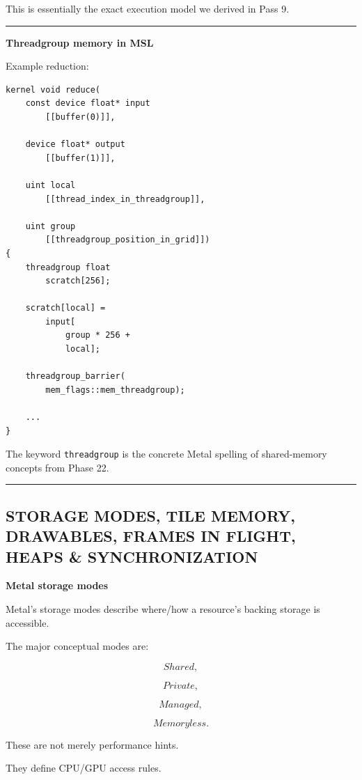 This is essentially the exact execution model we derived in Pass 9.

\begin{center}\rule{0.5\linewidth}{0.5pt}\end{center}

\textbf{Threadgroup memory in MSL}

Example reduction:

\begin{verbatim}
kernel void reduce(
    const device float* input
        [[buffer(0)]],

    device float* output
        [[buffer(1)]],

    uint local
        [[thread_index_in_threadgroup]],

    uint group
        [[threadgroup_position_in_grid]])
{
    threadgroup float
        scratch[256];

    scratch[local] =
        input[
            group * 256 +
            local];

    threadgroup_barrier(
        mem_flags::mem_threadgroup);

    ...
}
\end{verbatim}

The keyword \texttt{threadgroup} is the concrete Metal spelling of shared-memory concepts from Phase 22.

\begin{center}\rule{0.5\linewidth}{0.5pt}\end{center}

\subsection{STORAGE MODES, TILE MEMORY, DRAWABLES, FRAMES IN FLIGHT, HEAPS \& SYNCHRONIZATION}\label{05-engine-i-ch023-storage-modes-tile-memory-drawables-frames-in-flight-heaps-synchronization}

\textbf{Metal storage modes}

Metal's storage modes describe where/how a resource's backing storage is accessible.

The major conceptual modes are:

\[
Shared,
\]

\[
Private,
\]

\[
Managed,
\]

\[
Memoryless.
\]

These are not merely performance hints.

They define CPU/GPU access rules.

